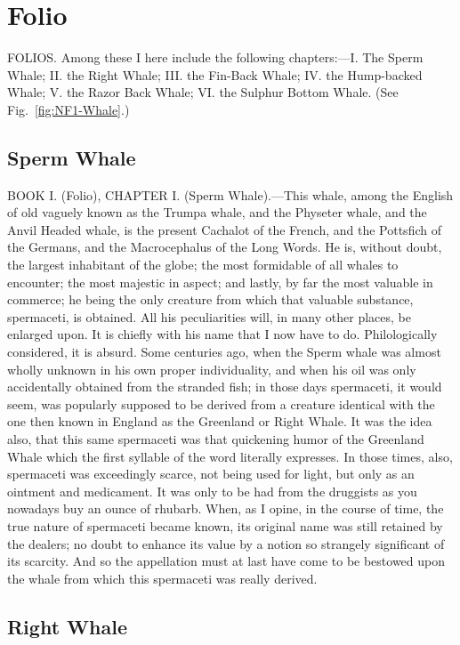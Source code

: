 \section{Folio}

FOLIOS. Among these I here include the following chapters:—I. The Sperm Whale; II. the Right Whale; III. the Fin-Back Whale; IV. the Hump-backed Whale; V. the Razor Back Whale; VI. the Sulphur Bottom Whale.
(See Fig.~\ref{fig:NF1-Whale}.)

\subsection{Sperm Whale}

BOOK I. (Folio), CHAPTER I. (Sperm Whale).—This whale, among the English of old vaguely known as the Trumpa whale, and the Physeter whale, and the Anvil Headed whale, is the present Cachalot of the French, and the Pottsfich of the Germans, and the Macrocephalus of the Long Words. He is, without doubt, the largest inhabitant of the globe; the most formidable of all whales to encounter; the most majestic in aspect; and lastly, by far the most valuable in commerce; he being the only creature from which that valuable substance, spermaceti, is obtained. All his peculiarities will, in many other places, be enlarged upon. It is chiefly with his name that I now have to do. Philologically considered, it is absurd. Some centuries ago, when the Sperm whale was almost wholly unknown in his own proper individuality, and when his oil was only accidentally obtained from the stranded fish; in those days spermaceti, it would seem, was popularly supposed to be derived from a creature identical with the one then known in England as the Greenland or Right Whale. It was the idea also, that this same spermaceti was that quickening humor of the Greenland Whale which the first syllable of the word literally expresses. In those times, also, spermaceti was exceedingly scarce, not being used for light, but only as an ointment and medicament. It was only to be had from the druggists as you nowadays buy an ounce of rhubarb. When, as I opine, in the course of time, the true nature of spermaceti became known, its original name was still retained by the dealers; no doubt to enhance its value by a notion so strangely significant of its scarcity. And so the appellation must at last have come to be bestowed upon the whale from which this spermaceti was really derived.

\subsection{Right Whale}

